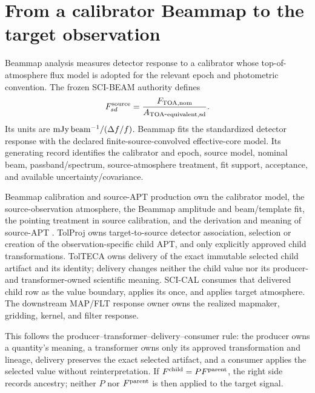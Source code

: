 \documentclass[11pt]{article}
\begin{document}
\section{From a calibrator Beammap to the target observation}\label{sec:flxscale}
Beammap analysis measures detector response to a calibrator whose
top-of-atmosphere flux model is adopted for the relevant epoch and photometric
convention. The frozen SCI-BEAM authority defines
\begin{equation}
 F^{\rm source}_{sd}=
 \frac{F_{\rm TOA,nom}}
      {A_{\rm TOA\mbox{-}equivalent,sd}}.
 \label{eq:flxscale-concept}
\end{equation}
Its units are \(\mathrm{mJy\,beam^{-1}}/(\Delta f/f)\). Beammap fits the standardized detector
response with the declared finite-source-convolved effective-core model. Its
generating record identifies the calibrator and epoch, source model, nominal
beam, passband/spectrum, source-atmosphere treatment, fit support, acceptance,
and available uncertainty/covariance.

Beammap calibration and source-APT production own the calibrator model, the
source-observation atmosphere, the Beammap amplitude and beam/template fit,
the pointing treatment in source calibration, and the derivation and meaning
of source-APT . TolProj owns target-to-source detector
association, selection or creation of the observation-specific child APT, and
only explicitly approved child transformations. TolTECA owns delivery of the
exact immutable selected child artifact and its identity; delivery changes
neither the child value nor its producer- and transformer-owned scientific
meaning. SCI-CAL consumes that delivered child row as the value boundary,
applies its  once, and applies target atmosphere. The downstream
MAP/FLT response owner owns the realized mapmaker, gridding, kernel, and filter
response.

This follows the producer--transformer--delivery--consumer rule: the producer
owns a quantity's meaning, a transformer owns only its approved transformation
and lineage, delivery preserves the exact selected artifact, and a consumer
applies the selected value without reinterpretation.
If
\(F^{\rm child}=P F^{\rm parent}\), the right side records ancestry; neither
\(P\) nor \(F^{\rm parent}\) is then applied to the target signal.
\end{document}
